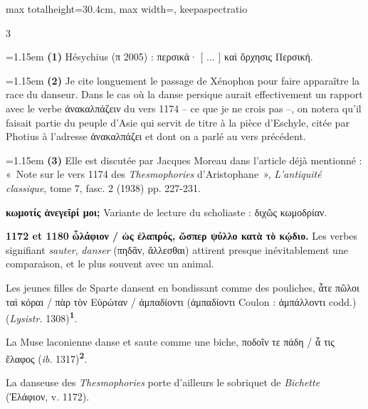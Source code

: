 \documentclass[11pt,twoside]{book}
\newcommand{\italique}[1]{\textit{#1}}
\newcommand{\marqueur}[1]{\textsuperscript{\color{rubricRed}\textbf{#1}}}
\begin{document}
\begin{adjustbox}{max totalheight=30.4cm, max width=\textwidth, keepaspectratio}
\begin{minipage}{\textwidth}
{\begin{multicols}{3}
\par\vspace{1.5pt}
\noindent\hangindent=1.15em {\color{sepiaNote}\textbf{(1)}} Hésychius (π 2005) : περσικά· [ ... ] καὶ ὄρχησις Περσική.
\par\vspace{1.5pt}
\noindent\hangindent=1.15em {\color{sepiaNote}\textbf{(2)}} Je cite longuement le passage de Xénophon pour faire apparaître la race du danseur. Dans le cas où la danse persique aurait effectivement un rapport avec le verbe ἀνακαλπάζειν du vers 1174 -- ce que je ne crois pas --, on notera qu'il faisait partie du peuple d'Asie qui servit de titre à la pièce d'Eschyle, citée par Photius à l'adresse ἀνακαλπάζει et dont on a parlé au vers précédent.
\par\vspace{1.5pt}
\noindent\hangindent=1.15em {\color{sepiaNote}\textbf{(3)}} Elle est discutée par Jacques Moreau dans l'article déjà mentionné : «~Note sur le vers 1174 des \italique{Thesmophories} d'Aristophane~», \italique{L'antiquité classique}, tome 7, fasc. 2 (1938) pp. 227-231.
\par\vspace{1.5pt}
 \textbf{κωμοτίς ἀνεγεῖρί μοι;} Variante de lecture du scholiaste : διχῶς κωμοδρίαν.
\par\vspace{1.5pt}
\noindent\textbf{1172 et 1180} \textbf{ὦλάφιον / ὡς ἐλαπρός, ὥσπερ ψύλλο κατὰ τὸ κῴδιο.} Les verbes signifiant \italique{sauter}, \italique{danser} (πηδᾶν, ἄλλεσθαι) attirent presque inévitablement une comparaison, et le plus souvent avec un animal.
\par\vspace{1.5pt}
\noindent Les jeunes filles de Sparte dansent en bondissant comme des pouliches, ἇτε πῶλοι ταὶ κόραι / πὰρ τὸν Εὐρώταν / ἀμπαδίοντι (ἀμπαδίοντι Coulon : ἀμπάλλοντι codd.) (\italique{Lysistr.} 1308)\marqueur{1}.
\par\vspace{1.5pt}
\noindent La Muse laconienne danse et saute comme une biche, ποδοῖν τε πάδη / ἇ τις ἔλαφος (\italique{ib}. 1317)\marqueur{2}.
\par\vspace{1.5pt}
\noindent La danseuse des \italique{Thesmophories} porte d'ailleurs le sobriquet de \italique{Bichette} (Ἐλάφιον, v. 1172).
\par\vspace{1.5pt}

\end{multicols}}
\end{minipage}
\end{adjustbox}
\end{document}
